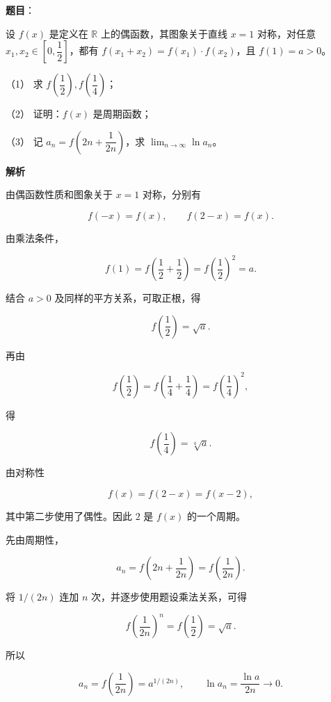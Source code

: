 \begin{answer}

\textbf{题目}：

设 $f(x)$ 是定义在 $\mathbb R$ 上的偶函数，其图象关于直线 $x=1$ 对称，对任意 $x_1,x_2\in\left[0,\dfrac12\right]$，都有 $f(x_1+x_2)=f(x_1)\cdot f(x_2)$，且 $f(1)=a>0$。

（1） 求 $f\left(\dfrac12\right),f\left(\dfrac14\right)$；

（2） 证明：$f(x)$ 是周期函数；

（3） 记 $a_n=f\left(2n+\dfrac1{2n}\right)$，求 $\displaystyle\lim_{n\to\infty}\ln a_n$。

\textbf{解析}

由偶函数性质和图象关于 $x=1$ 对称，分别有

\nopagebreak[4]
\[
f(-x)=f(x),\qquad f(2-x)=f(x).
\]


由乘法条件，

\nopagebreak[4]
\[
f(1)=f\left(\frac12+\frac12\right)
=f\left(\frac12\right)^2=a.
\]

结合 $a>0$ 及同样的平方关系，可取正根，得

\nopagebreak[4]
\[
f\left(\frac12\right)=\sqrt a.
\]

再由

\nopagebreak[4]
\[
f\left(\frac12\right)
=f\left(\frac14+\frac14\right)
=f\left(\frac14\right)^2,
\]

得

\nopagebreak[4]
\[
f\left(\frac14\right)=\sqrt[4]a.
\]


由对称性

\nopagebreak[4]
\[
f(x)=f(2-x)=f(x-2),
\]

其中第二步使用了偶性。因此 $2$ 是 $f(x)$ 的一个周期。


先由周期性，

\nopagebreak[4]
\[
a_n=f\left(2n+\frac1{2n}\right)
=f\left(\frac1{2n}\right).
\]

将 $1/(2n)$ 连加 $n$ 次，并逐步使用题设乘法关系，可得

\nopagebreak[4]
\[
f\left(\frac1{2n}\right)^n=f\left(\frac12\right)=\sqrt a.
\]

所以

\nopagebreak[4]
\[
a_n=f\left(\frac1{2n}\right)=a^{1/(2n)},
\qquad
\ln a_n=\frac{\ln a}{2n}\longrightarrow0.
\]




\end{answer}